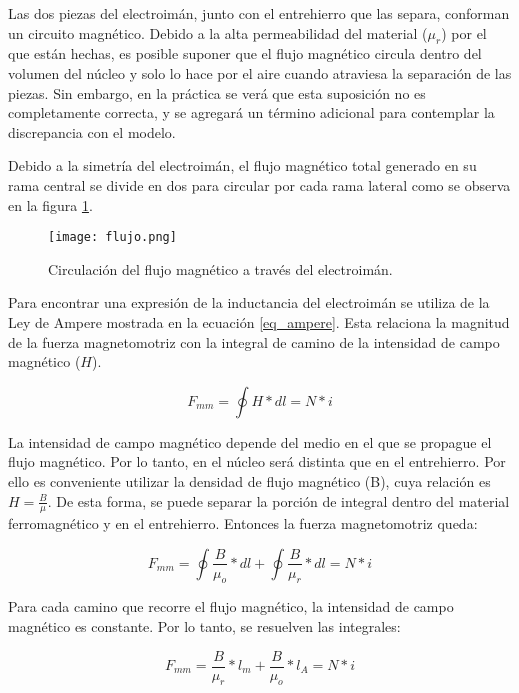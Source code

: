 Las dos piezas del electroimán, junto con el entrehierro que las separa, conforman un circuito magnético. Debido a la alta permeabilidad del material ($\mu_{r}$) por el que están hechas, es posible suponer que el flujo magnético circula dentro del volumen del núcleo y solo lo hace por el aire cuando atraviesa la separación de las piezas. Sin embargo, en la práctica se verá que esta suposición no es completamente correcta, y se agregará un término adicional para contemplar la discrepancia con el modelo.

Debido a la simetría del electroimán, el flujo magnético total generado en su rama central se divide en dos para circular por cada rama lateral como se observa en la figura \ref{fig:img_flujo}.

\begin{figure}[H]
	\centering
	\texttt{[image: flujo.png]}
	\caption{Circulación del flujo magnético a través del electroimán.}
	\label{fig:img_flujo}
\end{figure}

\noindent Para encontrar una expresión de la inductancia del electroimán se utiliza de la Ley de Ampere mostrada en la ecuación \ref{eq_ampere}. Esta relaciona la magnitud de la fuerza magnetomotriz con la integral de camino de la intensidad de campo magnético ($H$).

\begin{equation} \label{eq_ampere}
	F_{mm}=\oint{H*dl}=N*i
\end{equation}

\noindent La intensidad de campo magnético depende del medio en el que se propague el flujo magnético. Por lo tanto, en el núcleo será distinta que en el entrehierro. Por ello es conveniente utilizar la densidad de flujo magnético (B), cuya relación es $H=\frac{B}{\mu}$. De esta forma, se puede separar la porción de integral dentro del material ferromagnético y en el entrehierro. Entonces la fuerza magnetomotriz queda:

\begin{equation} 
	F_{mm}=\oint{\frac{B}{\mu_{o}}*dl}+\oint{\frac{B}{\mu_{r}}*dl}=N*i
\end{equation}

\noindent Para cada camino que recorre el flujo magnético, la intensidad de campo magnético es constante. Por lo tanto, se resuelven las integrales:

\begin{equation}\label{eq_fuerza-mm}
	F_{mm}=\frac{B}{\mu_{r}}*l_{m}+\frac{B}{\mu_{o}}*l_{A}=N*i
\end{equation}

